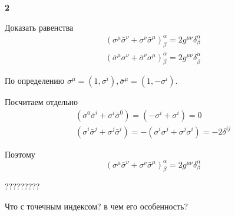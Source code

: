 \documentclass[a4paper,12pt]{article} %
\begin{document}
\begin{task}\textbf{2}

Доказать равенства
$$
\begin{array}{l}
\left(\sigma^{\mu} \bar{\sigma}^{\nu}+\sigma^{\nu} \bar{\sigma}^{\mu}\right)_{\beta}^{\alpha}=2 g^{\mu \nu} \delta_{\beta}^{\alpha} \\
\left(\bar{\sigma}^{\mu} \sigma^{\nu}+\bar{\sigma}^{\nu} \sigma^{\mu}\right)_{\dot{\beta}}^{\dot{\alpha}}=2 g^{\mu \nu} \delta_{\dot{\beta}}^{\dot{\alpha}}
\end{array}
$$

По определению $ \sigma^{\mu}=(1,\sigma^{i}), \bar{\sigma}^{\mu}= (1,-\sigma^i)$.

Посчитаем отдельно 
$$
\begin{array}{l}
	\left(\sigma^{0} \bar{\sigma}^{i}+\sigma^{i} \bar{\sigma}^{0}\right)=
	(-\sigma^{i}+\sigma^{i})=0
	\\
	\left(\sigma^{i} \bar{\sigma}^{j}+\sigma^{j} \bar{\sigma}^{i}\right)=
-(\sigma^{i}\sigma^{j}+\sigma^{j}\sigma^{i})=-2\delta^{ij}
\end{array}
$$

Поэтому 
\[ \left(\sigma^{\mu} \bar{\sigma}^{\nu}+\sigma^{\nu} \bar{\sigma}^{\mu}\right)_{\beta}^{\alpha}=
2 g^{\mu \nu} \delta_{\beta}^{\alpha} \]


?????????

Что с точечным индексом? в чем его особенность?






\end{task}
\end{document}
